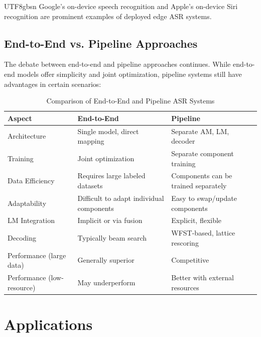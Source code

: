\documentclass[12pt,a4paper]{article}
\begin{document}
\begin{CJK}{UTF8}{gbsn}
Google's on-device speech recognition and Apple's on-device Siri recognition are prominent examples of deployed edge ASR systems.

\subsection{End-to-End vs. Pipeline Approaches}
\label{subsec:e2e_vs_pipe}

The debate between end-to-end and pipeline approaches continues. While end-to-end models offer simplicity and joint optimization, pipeline systems still have advantages in certain scenarios:

\begin{table}[htbp]
\centering
\caption{Comparison of End-to-End and Pipeline ASR Systems}
\label{tab:e2e_vs_pipe}
\begin{tabular}{@{}p{4cm}p{5.5cm}p{5.5cm}@{}}
\toprule
\textbf{Aspect} & \textbf{End-to-End} & \textbf{Pipeline} \\
\midrule
Architecture & Single model, direct mapping & Separate AM, LM, decoder \\
Training & Joint optimization & Separate component training \\
Data Efficiency & Requires large labeled datasets & Components can be trained separately \\
Adaptability & Difficult to adapt individual components & Easy to swap/update components \\
LM Integration & Implicit or via fusion & Explicit, flexible \\
Decoding & Typically beam search & WFST-based, lattice rescoring \\
Performance (large data) & Generally superior & Competitive \\
Performance (low-resource) & May underperform & Better with external resources \\
\bottomrule
\end{tabular}
\end{table}

\section{Applications}
\label{sec:applications}


\end{CJK}
\end{document}
